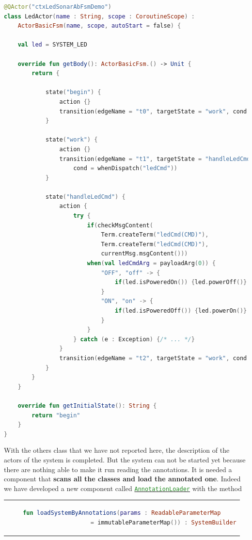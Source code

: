 \begin{lstlisting}[caption=\texttt{LedActor (\texttt{ledsonarsystem0})},language=Kotlin]
@QActor("ctxLedSonarAbFsmDemo")
class LedActor(name : String, scope : CoroutineScope) :
	ActorBasicFsm(name, scope, autoStart = false) {

	val led = SYSTEM_LED

	override fun getBody(): ActorBasicFsm.() -> Unit {
		return {
			
			state("begin") {
				action {}
				transition(edgeName = "t0", targetState = "work", cond = doswitch())
			}
			
			state("work") {
				action {}
				transition(edgeName = "t1", targetState = "handleLedCmd",
					cond = whenDispatch("ledCmd"))
			}
			
			state("handleLedCmd") {
				action {
					try {
						if(checkMsgContent(
							Term.createTerm("ledCmd(CMD)"),
							Term.createTerm("ledCmd(CMD)"),
							currentMsg.msgContent()))
						when(val ledCmdArg = payloadArg(0)) {
							"OFF", "off" -> {
								if(led.isPoweredOn()) {led.powerOff()}
							}
							"ON", "on" -> {
								if(led.isPoweredOff()) {led.powerOn()}
							}
						}
					} catch (e : Exception) {/* ... */}
				}
				transition(edgeName = "t2", targetState = "work", cond = doswitch())
			}
		}
	}

	override fun getInitialState(): String {
		return "begin"
	}
}
\end{lstlisting}

With the others class that we have not reported here, the description of the actors of the system is completed. But the system can not be started yet because there are nothing able to make it run reading the annotations. It is needed a component that \textbf{scans all the classes and load the annotated one}.
Indeed we have developed a new component called \href{https://github.com/LM-96/QA-Extensions/blob/main/it.unibo.qakactor/src/main/kotlin/annotations/AnnotationLoader.kt}{\textcolor{ForestGreen}{\texttt{AnnotationLoader}}} with the method 
\begin{center}
	\begin{tabular}{c}
		\begin{lstlisting}[frame=none,numbers=none,language=Kotlin]
			fun loadSystemByAnnotations(params : ReadableParameterMap
						= immutableParameterMap()) : SystemBuilder
		\end{lstlisting}
	\end{tabular}
\end{center}

